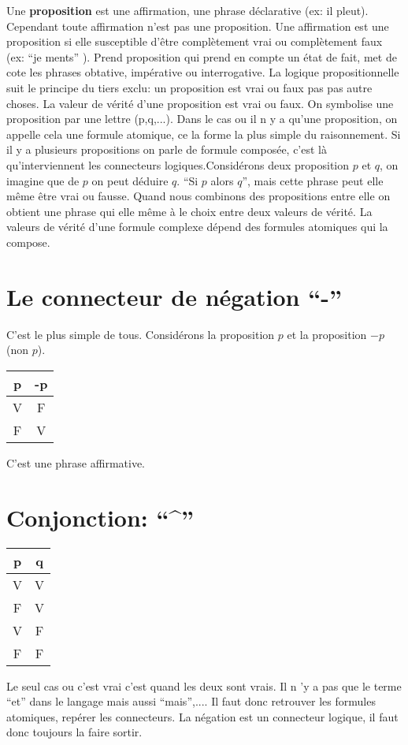 \documentclass[11pt,a4paper]{article} %
\begin{document}
Une \textbf{proposition} est une affirmation, une phrase déclarative (ex: il pleut).
Cependant toute affirmation n'est pas une proposition.
Une affirmation est une proposition si elle susceptible d'être complètement vrai ou complètement faux (ex: ``je ments'' ).
Prend proposition qui prend en compte un état de fait, met de cote les phrases obtative, impérative ou interrogative.
La logique propositionnelle suit le principe du tiers exclu: un proposition est vrai ou faux pas pas autre choses.
La valeur de vérité d'une proposition est vrai ou faux.
On symbolise une proposition par une lettre (p,q,$...$).
Dans le cas ou il n y a qu'une proposition, on appelle cela une formule atomique, ce la forme la plus simple du raisonnement.
Si il y a plusieurs propositions on parle de formule composée, c'est là qu'interviennent les connecteurs logiques.Considérons deux proposition $p$ et $q$, on imagine que de $p$ on peut déduire $q$.
``Si $p$ alors $q$'', mais cette phrase peut elle même être vrai ou fausse.
Quand nous combinons des propositions entre elle on obtient une phrase qui elle même à le choix entre deux valeurs de vérité.
La valeurs de vérité d'une formule complexe dépend des formules atomiques qui la compose.\\

\section{Le connecteur de négation ``-''}
C'est le plus simple de tous. Considérons la proposition $p$ et la proposition $-p$ (non $p$). \\
\begin{center}
	\begin{tabular}{|c|c|}
		\hline
		p&-p\\
		\hline
		V&F\\
		\hline
		F&V\\
		\hline
	\end{tabular}
\end{center}
C'est une phrase affirmative.
\section{Conjonction: ``\^{}''}
\begin{center}
	\begin{tabular}{|c|c|}
		\hline
		p&q\\
		\hline
		V&V\\
		\hline
		F&V\\
		\hline
		V&F\\
		\hline
		F&F\\
		\hline
	\end{tabular}
\end{center}
Le seul cas ou c'est vrai c'est quand les deux sont vrais.
Il n 'y a pas que le terme ``et'' dans le langage mais aussi ``mais'',$...$.
Il faut donc retrouver les formules atomiques, repérer les connecteurs.
La négation est un connecteur logique, il faut donc toujours la faire sortir.
\end{document}
